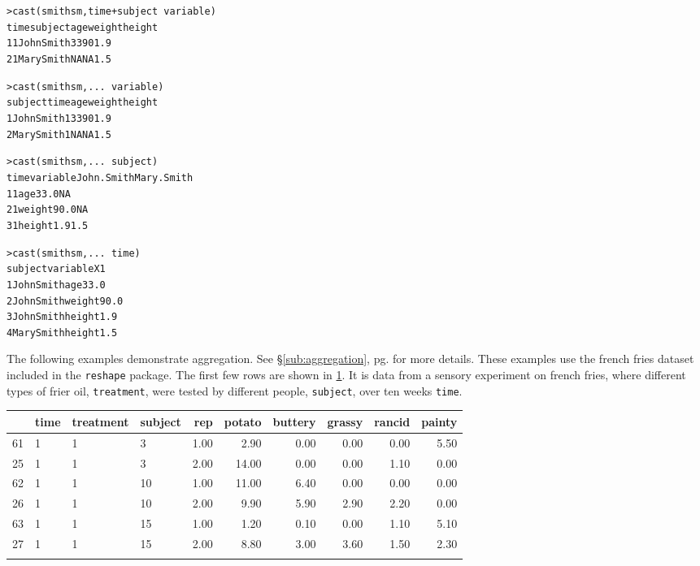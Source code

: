 \documentclass[oneside,letterpaper]{scrartcl}
\newcommand{\secref}[1]{\S \ref{#1}, pg. \pageref{#1}}
\begin{document}
\begin{alltt}
> cast(smithsm, time + subject ~ variable)
  time    subject age weight height
1    1 John Smith  33     90    1.9
2    1 Mary Smith  NA     NA    1.5

> cast(smithsm, ... ~ variable)
     subject time age weight height
1 John Smith    1  33     90    1.9
2 Mary Smith    1  NA     NA    1.5

> cast(smithsm, ... ~ subject)
  time variable John.Smith Mary.Smith
1    1      age       33.0         NA
2    1   weight       90.0         NA
3    1   height        1.9        1.5

> cast(smithsm, ... ~ time)
     subject variable   X1
1 John Smith      age 33.0
2 John Smith   weight 90.0
3 John Smith   height  1.9
4 Mary Smith   height  1.5

\end{alltt}

The following examples demonstrate aggregation.  See \secref{sub:aggregation} for more details.  These examples use the french fries dataset included in the {\tt reshape} package.  The first few rows are shown in \ref{tbl:ff}.  It is data from a sensory experiment on french fries, where different types of frier oil, {\tt treatment}, were tested by different people, {\tt subject}, over ten weeks {\tt time}.

\begin{table}[ht]
\begin{center}
\begin{tabular}{rlllrrrrrr}
\hline
 & time & treatment & subject & rep & potato & buttery & grassy & rancid & painty \\
\hline
61 & 1 & 1 & 3 & 1.00 & 2.90 & 0.00 & 0.00 & 0.00 & 5.50 \\
25 & 1 & 1 & 3 & 2.00 & 14.00 & 0.00 & 0.00 & 1.10 & 0.00 \\
62 & 1 & 1 & 10 & 1.00 & 11.00 & 6.40 & 0.00 & 0.00 & 0.00 \\
26 & 1 & 1 & 10 & 2.00 & 9.90 & 5.90 & 2.90 & 2.20 & 0.00 \\
63 & 1 & 1 & 15 & 1.00 & 1.20 & 0.10 & 0.00 & 1.10 & 5.10 \\
27 & 1 & 1 & 15 & 2.00 & 8.80 & 3.00 & 3.60 & 1.50 & 2.30 \\
\hline
\label{tbl:ff}
\end{tabular}
\end{center}
\end{table}
\end{document}

